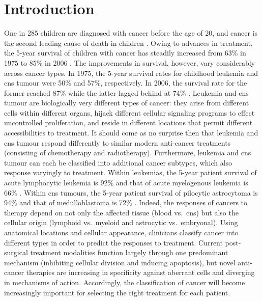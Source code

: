 \chapter{Introduction}
\label{ch:intro}

One in 285 children are diagnosed with cancer before the age of 20, and cancer is the second leading cause of death in children . Owing to advances in treatment, the 5-year survival of children with cancer has steadily increased from 63\% in 1975 to 85\% in 2006 . The improvements in survival, however, vary considerably across cancer types. In 1975, the 5-year survival rates for childhood leukemia and \gls{cns} tumour were 50\% and 57\%, respectively. In 2006, the survival rate for the former reached 87\% while the latter lagged behind at 74\% . Leukemia and \gls{cns} tumour are biologically very different types of cancer: they arise from different cells within different organs, hijack different cellular signaling programs to effect uncontrolled proliferation, and reside in different locations that permit different accessibilities to treatment. It should come as no surprise then that leukemia and \gls{cns} tumour respond differently to similar modern anti-cancer treatments (consisting of chemotherapy and radiotherapy). Furthermore, leukemia and \gls{cns} tumour can each be classified into additional cancer subtypes, which also response varyingly to treatment. Within leukemias, the 5-year patient survival of acute lymphocytic leukemia is 92\% and that of acute myelogenous leukemia is 66\% . Within \gls{cns} tumours, the 5-year patient survival of pilocytic astrocytoma is 94\% and that of medulloblastoma is 72\% . Indeed, the responses of cancers to therapy depend on not only the affected tissue (blood vs.\ \gls{cns}) but also the cellular origin (lymphoid vs.\ myeloid and astrocytic vs.\ embryonal). Using anatomical locations and cellular appearance, clinicians classify cancer into different types in order to predict the responses to treatment. Current post-surgical treatment modalities function largely through one predominant mechanism (inhibiting cellular division and inducing apoptosis), but novel anti-cancer therapies are increasing in specificity against aberrant cells and diverging in mechanisms of action. Accordingly, the classification of cancer will become increasingly important for selecting the right treatment for each patient.

